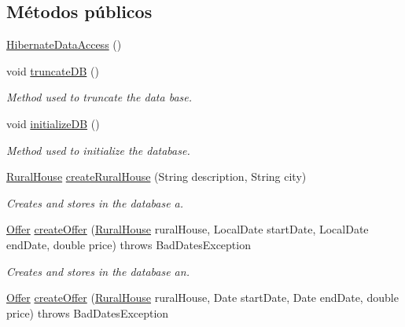 \subsection*{Métodos públicos}
\begin{DoxyCompactItemize}
\item 
\mbox{\hyperlink{classcom_1_1ruralhousejsf_1_1data_access_1_1_hibernate_data_access_a8e0ec929d78d37a992837db0ba7e9602}{Hibernate\+Data\+Access}} ()
\item 
void \mbox{\hyperlink{classcom_1_1ruralhousejsf_1_1data_access_1_1_hibernate_data_access_a81a5e60db58acfc1a3c1de2f014813d5}{truncate\+DB}} ()
\begin{DoxyCompactList}\small\item\em Method used to truncate the data base. \end{DoxyCompactList}\item 
void \mbox{\hyperlink{classcom_1_1ruralhousejsf_1_1data_access_1_1_hibernate_data_access_af6f8016d5e185e86519871913781fe73}{initialize\+DB}} ()
\begin{DoxyCompactList}\small\item\em Method used to initialize the database. \end{DoxyCompactList}\item 
\mbox{\hyperlink{classcom_1_1ruralhousejsf_1_1domain_1_1_rural_house}{Rural\+House}} \mbox{\hyperlink{classcom_1_1ruralhousejsf_1_1data_access_1_1_hibernate_data_access_a23eafc2c1f43052f2005a863d6592abc}{create\+Rural\+House}} (String description, String city)
\begin{DoxyCompactList}\small\item\em Creates and stores in the database a. \end{DoxyCompactList}\item 
\mbox{\hyperlink{classcom_1_1ruralhousejsf_1_1domain_1_1_offer}{Offer}} \mbox{\hyperlink{classcom_1_1ruralhousejsf_1_1data_access_1_1_hibernate_data_access_a332f591a06df13d36814ff215008987b}{create\+Offer}} (\mbox{\hyperlink{classcom_1_1ruralhousejsf_1_1domain_1_1_rural_house}{Rural\+House}} rural\+House, Local\+Date start\+Date, Local\+Date end\+Date, double price)  throws Bad\+Dates\+Exception 
\begin{DoxyCompactList}\small\item\em Creates and stores in the database an. \end{DoxyCompactList}\item 
\mbox{\hyperlink{classcom_1_1ruralhousejsf_1_1domain_1_1_offer}{Offer}} \mbox{\hyperlink{classcom_1_1ruralhousejsf_1_1data_access_1_1_hibernate_data_access_aeff0125a8998d3f3529028592a13efb0}{create\+Offer}} (\mbox{\hyperlink{classcom_1_1ruralhousejsf_1_1domain_1_1_rural_house}{Rural\+House}} rural\+House, Date start\+Date, Date end\+Date, double price)  throws Bad\+Dates\+Exception 

\end{DoxyCompactItemize}
